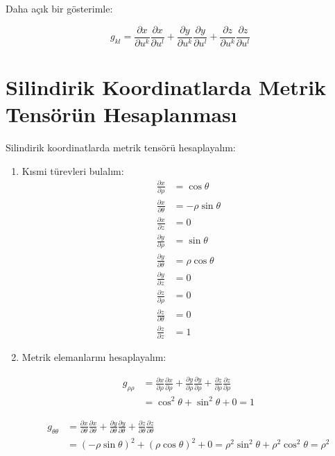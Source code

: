 \documentclass[11pt,letterpaper,twocolumn]{fenbil}
\begin{document}
Daha açık bir gösterimle:

\begin{equation}
g_{kl} = \frac{\partial x}{\partial u^k} \frac{\partial x}{\partial u^l} + \frac{\partial y}{\partial u^k} \frac{\partial y}{\partial u^l} + \frac{\partial z}{\partial u^k} \frac{\partial z}{\partial u^l}
\end{equation}

\section{Silindirik Koordinatlarda Metrik Tensörün Hesaplanması}

Silindirik koordinatlarda metrik tensörü hesaplayalım:

\begin{enumerate}
\item Kısmi türevleri bulalım:
   \begin{align}
   \frac{\partial x}{\partial \rho} &= \cos \theta\\
   \frac{\partial x}{\partial \theta} &= -\rho \sin \theta\\
   \frac{\partial x}{\partial z} &= 0\\
   \frac{\partial y}{\partial \rho} &= \sin \theta\\
   \frac{\partial y}{\partial \theta} &= \rho \cos \theta\\
   \frac{\partial y}{\partial z} &= 0\\
   \frac{\partial z}{\partial \rho} &= 0\\
   \frac{\partial z}{\partial \theta} &= 0\\
   \frac{\partial z}{\partial z} &= 1
   \end{align}

\item Metrik elemanlarını hesaplayalım:
   
   \begin{align}
   g_{\rho\rho} &= \frac{\partial x}{\partial \rho}\frac{\partial x}{\partial \rho} + \frac{\partial y}{\partial \rho}\frac{\partial y}{\partial \rho} + \frac{\partial z}{\partial \rho}\frac{\partial z}{\partial \rho}\\
   &= \cos^2 \theta + \sin^2 \theta + 0 = 1
   \end{align}
   
   \begin{align}
   g_{\theta\theta} &= \frac{\partial x}{\partial \theta}\frac{\partial x}{\partial \theta} + \frac{\partial y}{\partial \theta}\frac{\partial y}{\partial \theta} + \frac{\partial z}{\partial \theta}\frac{\partial z}{\partial \theta}\\
   &= (-\rho \sin \theta)^2 + (\rho \cos \theta)^2 + 0 = \rho^2 \sin^2 \theta + \rho^2 \cos^2 \theta = \rho^2
   \end{align}
   

\end{enumerate}
\end{document}
